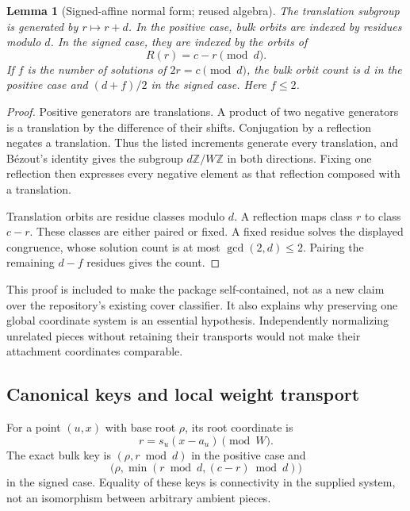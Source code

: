 \documentclass[11pt]{article}
\newtheorem{lemma}[theorem]{Lemma}
\theoremstyle{definition}
\newcommand{\Z}{\mathbb Z}
\begin{document}
\begin{lemma}[Signed-affine normal form; reused algebra]
\label{lem:normal}
The translation subgroup is generated by $r\mapsto r+d$. In the positive case, bulk orbits are indexed by residues modulo $d$. In the signed case, they are indexed by the orbits of
\begin{equation}
 R(r)=c-r\pmod d.
 \label{eq:reflection}
\end{equation}
If $f$ is the number of solutions of $2r=c\pmod d$, the bulk orbit count is $d$ in the positive case and $(d+f)/2$ in the signed case. Here $f\le2$.
\end{lemma}
\begin{proof}
Positive generators are translations. A product of two negative generators is a translation by the difference of their shifts. Conjugation by a reflection negates a translation. Thus the listed increments generate every translation, and B\'ezout's identity gives the subgroup $d\Z/W\Z$ in both directions. Fixing one reflection then expresses every negative element as that reflection composed with a translation.

Translation orbits are residue classes modulo $d$. A reflection maps class $r$ to class $c-r$. These classes are either paired or fixed. A fixed residue solves the displayed congruence, whose solution count is at most $\gcd(2,d)\le2$. Pairing the remaining $d-f$ residues gives the count.
\end{proof}

This proof is included to make the package self-contained, not as a new claim over the repository's existing cover classifier. It also explains why preserving one global coordinate system is an essential hypothesis. Independently normalizing unrelated pieces without retaining their transports would not make their attachment coordinates comparable.

\subsection{Canonical keys and local weight transport}
For a point $(u,x)$ with base root $\rho$, its root coordinate is
\[
 r=s_u(x-a_u)\pmod W.
\]
The exact bulk key is $(\rho,r\bmod d)$ in the positive case and
\begin{equation}
 \bigl(\rho,\min(r\bmod d,(c-r)\bmod d)\bigr)
 \label{eq:key}
\end{equation}
in the signed case. Equality of these keys is connectivity in the supplied system, not an isomorphism between arbitrary ambient pieces.
\end{document}

